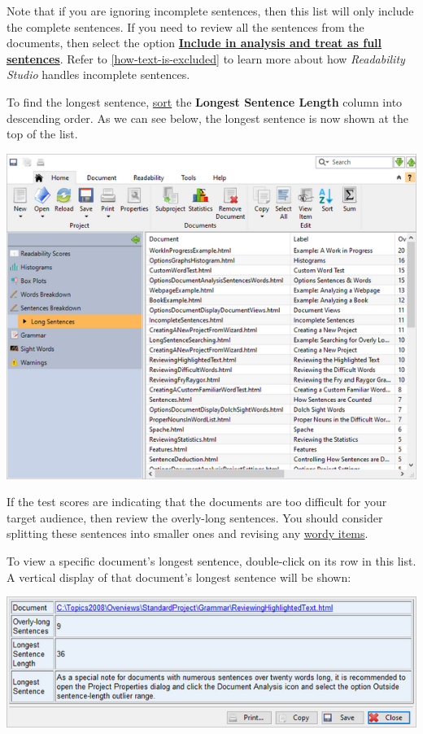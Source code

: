 \documentclass[
]{book}
\theoremstyle{definition}
\theoremstyle{definition}
\theoremstyle{definition}
\theoremstyle{definition}
\theoremstyle{remark}
\begin{document}
Note that if you are ignoring incomplete sentences, then this list will only include the complete sentences. If you need to review all the sentences from the documents, then select the option \protect\hyperlink{document-analysis}{\textbf{Include in analysis and treat as full sentences}}. Refer to \ref{how-text-is-excluded} to learn more about how \emph{Readability Studio} handles incomplete sentences.

To find the longest sentence, \protect\hyperlink{column-sorting}{sort} the \textbf{Longest Sentence Length} column into descending order. As we can see below, the longest sentence is now shown at the top of the list.

\includegraphics{Images/batchlongestsentence.png}

If the test scores are indicating that the documents are too difficult for your target audience, then review the overly-long sentences. You should consider splitting these sentences into smaller ones and revising any \protect\hyperlink{reviewing-batch-wordiness}{wordy items}.

To view a specific document's longest sentence, double-click on its row in this list. A vertical display of that document's longest sentence will be shown:

\begin{center}\includegraphics[width=0.75\linewidth,]{Images/batchlongestsentenceviewitem} \end{center}
\end{document}
